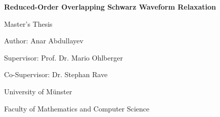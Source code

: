 \documentclass[twoside, 11pt]{report}
\theoremstyle{definition}
\theoremstyle{remark}
\begin{document}
\begin{titlepage}
\centering

\vspace*{4cm}

{\huge\bfseries Reduced-Order Overlapping Schwarz Waveform Relaxation \par}

\vspace{2.5cm}

{\Large Master's Thesis \par}

\vspace{1.5cm}

{\Large Author: Anar Abdullayev \par}

\vspace{0.8cm}

{\large Supervisor: Prof. Dr. Mario Ohlberger \par}

\vspace{0.3cm}

{\large Co-Supervisor: Dr. Stephan Rave \par}

\vfill

{\large University of Münster \par}
\vspace{0.3cm}
{\large Faculty of Mathematics and Computer Science \par}

\end{titlepage}


\begin{abstract}
Short summary.
\end{abstract}

\tableofcontents
\listoffigures
\end{document}
